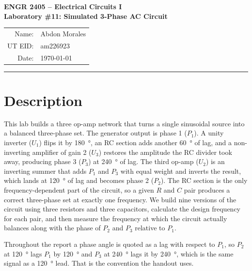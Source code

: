 \documentclass[11pt]{article}
\begin{document}
\begin{center}
    {\large\bfseries ENGR 2405 -- Electrical Circuits I}\\[2pt]
    {\large\bfseries Laboratory \#11: Simulated 3-Phase AC Circuit}\\[10pt]
    \begin{tabular}{rl}
        Name:    & Abdon Morales \\
        UT EID:  & am226923 \\
        Date:    & \today \\
    \end{tabular}
\end{center}
\vspace{0.5em}
\hrule
\vspace{1.5em}

\section*{Description}
This lab builds a three op-amp network that turns a single sinusoidal source into
a balanced three-phase set. The generator output is phase 1 ($P_1$). A unity
inverter ($U_1$) flips it by \qty{180}{\degree}, an RC section adds another
\qty{60}{\degree} of lag, and a non-inverting amplifier of gain 2 ($U_3$)
restores the amplitude the RC divider took away, producing phase 3 ($P_3$) at
\qty{240}{\degree} of lag. The third op-amp ($U_2$) is an inverting summer that
adds $P_1$ and $P_3$ with equal weight and inverts the result, which lands at
\qty{120}{\degree} of lag and becomes phase 2 ($P_2$). The RC section is the only
frequency-dependent part of the circuit, so a given $R$ and $C$ pair produces a
correct three-phase set at exactly one frequency. We build nine versions of the
circuit using three resistors and three capacitors, calculate the design
frequency for each pair, and then measure the frequency at which the circuit
actually balances along with the phase of $P_2$ and $P_3$ relative to $P_1$.

Throughout the report a phase angle is quoted as a lag with respect to $P_1$, so
$P_2$ at \qty{120}{\degree} lags $P_1$ by \qty{120}{\degree} and $P_3$ at
\qty{240}{\degree} lags it by \qty{240}{\degree}, which is the same signal as a
\qty{120}{\degree} lead. That is the convention the handout uses.

\end{document}
